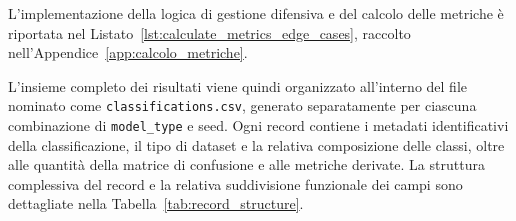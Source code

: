 L'implementazione della logica di gestione difensiva e del calcolo delle metriche è riportata nel Listato~\ref{lst:calculate_metrics_edge_cases}, raccolto nell'Appendice~\ref{app:calcolo_metriche}.

L'insieme completo dei risultati viene quindi organizzato all'interno del file nominato come \newline \texttt{classifications.csv}, generato separatamente per ciascuna combinazione di \texttt{model\_type} e seed. 
Ogni record contiene i metadati identificativi della classificazione, il tipo di dataset e la relativa composizione delle classi, oltre alle quantità della matrice di confusione e alle metriche derivate. 
La struttura complessiva del record e la relativa suddivisione funzionale dei campi sono dettagliate nella Tabella~\ref{tab:record_structure}.

